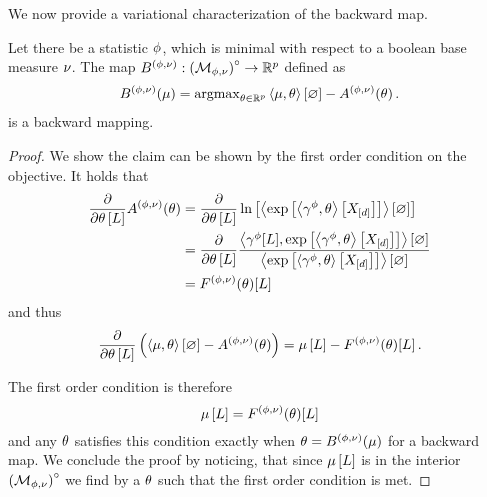 


We now provide a variational characterization of the backward map.

\begin{theorem}
    \label{the:varBackward}
    Let there be a statistic $\phi$, which is minimal with respect to a boolean base measure $\nu$.
    The map $B^{(\phi,\nu)}: {\left(\mathcal{M}_{\phi,\nu}\right)}^{\circ}\rightarrow\mathbb{R}^{p}$ defined as
    \begin{align*}
        B^{(\phi,\nu)}(\mu)
        = \mathrm{argmax}_{\theta\in\mathbb{R}^{p}}  \left\langle \mu,\theta\right\rangle \left[ \varnothing \right] - A^{(\phi,\nu)}(\theta) \, .
    \end{align*}
    is a backward mapping.
\end{theorem}
\begin{proof}
    We show the claim can be shown by the first order condition on the objective.
    It holds that
    \begin{align*}
        \frac{\partial }{\partial \theta\left[L\right]}  A^{(\phi,\nu)}(\theta)
        & = \frac{\partial }{\partial \theta\left[L\right]}  \ln \left[ \left\langle \mathrm{exp}\left[\left\langle \gamma^{\phi},\theta\right\rangle \left[ X_{[d]} \right]\right]\right\rangle \left[ \varnothing \right] \right] \\
        & = \frac{\partial }{\partial \theta\left[L\right]} \frac{\left\langle \gamma^{\phi}[L],\mathrm{exp}\left[\left\langle \gamma^{\phi},\theta\right\rangle \left[ X_{[d]} \right]\right]\right\rangle \left[ \varnothing \right]}{\left\langle \mathrm{exp}\left[\left\langle \gamma^{\phi},\theta\right\rangle \left[ X_{[d]} \right]\right]\right\rangle \left[ \varnothing \right]}   \\
        & = F^{(\phi,\nu)}(\theta)[L]
    \end{align*}
    and thus
    \begin{align*}
        \frac{\partial }{\partial \theta\left[L\right]} \left( \left\langle \mu,\theta\right\rangle \left[ \varnothing \right] - A^{(\phi,\nu)}(\theta)  \right)
        = \mu\left[L\right] -  F^{(\phi,\nu)}(\theta)[L] \, .
    \end{align*}

    The first order condition is therefore
    \[ \mu\left[L\right] =  F^{(\phi,\nu)}(\theta)[L] \]
    and any $\theta$ satisfies this condition exactly when $\theta=B^{(\phi,\nu)}(\mu)$ for a backward map.
    We conclude the proof by noticing, that since $\mu\left[L\right]$ is in the interior ${\left(\mathcal{M}_{\phi,\nu}\right)}^{\circ}$ we find by  a $\theta$ such that the first order condition is met.
\end{proof}

